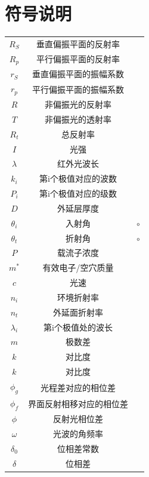 \documentclass[UTF8]{ctexart}
\begin{document}
\section{符号说明}
\begin{table}[H]
	\centering
	\begin{tabular}{ccc}
		\toprule[1.5pt]
		\makebox[0.3\textwidth][c]{变量名}&\makebox[0.4\textwidth][c]{符号说明}&\makebox[0.2\textwidth][c]{单位}\\
		\midrule[1pt]
		$R_S$&垂直偏振平面的反射率&\\
		\addlinespace
		$R_p$&平行偏振平面的反射率&\\
		\addlinespace
		$r_S$&垂直偏振平面的振幅系数&\\
		\addlinespace
		$r_p$&平行偏振平面的振幅系数&\\
		\addlinespace
		$R$&非偏振光的反射率&\\
		\addlinespace
		$T$&非偏振光的透射率&\\
		\addlinespace
		$R_t$&总反射率&\\
		\addlinespace
		$I$&光强&\\
		\addlinespace
		$\lambda$&红外光波长&\\
		\addlinespace
		$k_i$&第i个极值对应的波数&\\
		\addlinespace
		$P_i$&第i个极值对应的级数&\\
		\addlinespace
		$D$&外延层厚度&\\
		\addlinespace
		$\theta_i$&入射角&$\circ$\\
		\addlinespace
		$\theta_t$&折射角&$\circ$\\
		\addlinespace
		$P$&载流子浓度&\\
		\addlinespace
		$m^*$&有效电子/空穴质量&\\
		\addlinespace
		$c$&光速&\\
		\addlinespace
		$n_i$&环境折射率&\\
		\addlinespace
		$n_t$&外延面折射率&\\
		\addlinespace
		$\lambda_i$&第i个极值处的波长&\\
		\addlinespace
		$m$&极数差&\\
		\addlinespace
		$k$&对比度&\\
		\addlinespace
		$k$&对比度&\\
		\addlinespace
		$\phi_g$&光程差对应的相位差&\\
		\addlinespace
		$\phi_f$&界面反射相移对应的相位差&\\
		\addlinespace
		$\phi$&反射光相位差&\\
		\addlinespace
		$\omega$&光波的角频率&\\
		\addlinespace
		$\delta_0$&位相差常数&\\
		\addlinespace
		$\delta$&位相差&\\
		\bottomrule[1pt]
	\end{tabular}
\end{table}
\end{document}

